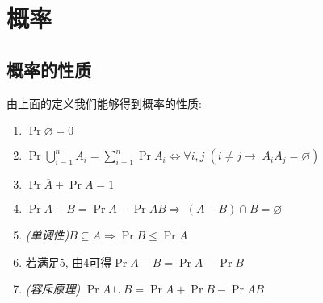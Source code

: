\section{概率}
\subsection{概率的性质}
由上面的定义我们能够得到概率的性质:
\begin{enumerate}
    \item
          $\Pr{\varnothing}=0$
    \item
          $\Pr{\bigcup_{i=1}^{n} A_i}=\sum_{i=1}^n\Pr{A_i}\iff\forall i, j\; (i\neq j\to\; A_iA_j = \varnothing)$
    \item
          $\Pr{\overline A} + \Pr{A} = 1$
    \item
          $\Pr{A-B} = \Pr{A} - \Pr{AB}\Rightarrow\ (A-B) \cap B = \varnothing$
    \item
          \emph{(单调性)}$B\subseteq A \Rightarrow \Pr{B}\leq\Pr{A}$
    \item
          若满足5, 由4可得$\Pr{A-B} = \Pr{A} - \Pr{B}$
    \item
          \emph{(容斥原理)}
          $\Pr{A\cup B}=\Pr{A} + \Pr{B} - \Pr{AB}$
\end{enumerate}
